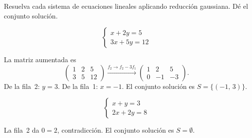 \documentclass{emate-ucr}
\begin{document}
\imprimirtitulo

\begin{ejercicio}
  Resuelva cada sistema de ecuaciones lineales aplicando reducción gaussiana.
  Dé el conjunto solución.

  \begin{subejercicios}
    \item
    \[
      \begin{cases}
         x + 2y =  5 \\
        3x + 5y = 12
      \end{cases}
    \]

    \begin{solucion}
      La matriz aumentada es
      \[
        \left(\begin{array}{cc|r} 1 & 2 & 5 \\ 3 & 5 & 12 \end{array}\right)
        \xrightarrow{f_2\to f_2-3f_1}
        \left(\begin{array}{cc|r} 1 & 2 & 5 \\ 0 & -1 & -3 \end{array}\right).
      \]
      De la fila~2: $y = 3$. De la fila~1: $x = -1$.
      El conjunto solución es $S = \{(-1,\,3)\}$.
    \end{solucion}

    \item
    \[
      \begin{cases}
         x + y = 3 \\
        2x + 2y = 8
      \end{cases}
    \]

    \begin{solucion}
      La fila~2 da $0 = 2$, contradicción. El conjunto solución es $S = \emptyset$.
    \end{solucion}

  \end{subejercicios}
\end{ejercicio}
\end{document}
